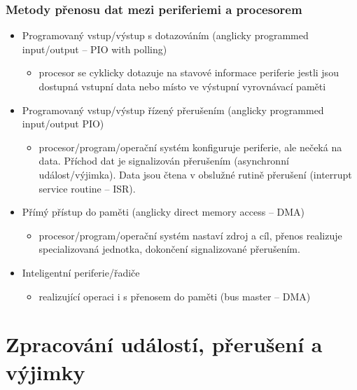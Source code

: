 \documentclass{beamer}
\begin{document}
\begin{frame}
\frametitle{Metody přenosu dat mezi periferiemi a procesorem}

\begin{itemize}
 \item Programovaný vstup/výstup s dotazováním (anglicky programmed input/output -- PIO with polling)
 \begin{itemize}
  \item procesor se cyklicky dotazuje na stavové informace periferie
        jestli jsou dostupná vstupní data nebo místo ve výstupní vyrovnávací paměti
 \end{itemize}
\end{itemize}
\begin{itemize}
 \item Programovaný vstup/výstup řízený přerušením (anglicky programmed input/output PIO)
 \begin{itemize}
  \item procesor/program/operační systém konfiguruje periferie, ale nečeká
        na data. Příchod dat je signalizován přerušením (asynchronní
        událost/výjimka). Data jsou čtena v obslužné rutině přerušení (interrupt service routine -- ISR).
 \end{itemize}
\end{itemize}
\begin{itemize}
 \item Přímý přístup do paměti (anglicky direct memory access -- DMA)
 \begin{itemize}
  \item procesor/program/operační systém nastaví zdroj a cíl, přenos realizuje
        specializovaná jednotka, dokončení signalizované přerušením.
 \end{itemize}
\end{itemize}
\begin{itemize}
 \item Inteligentní periferie/řadiče 
 \begin{itemize}
  \item realizující operaci i s přenosem do paměti (bus master -- DMA)
 \end{itemize}
\end{itemize}
\end{frame}

\section{Zpracování událostí, přerušení a výjimky}
\end{document}
